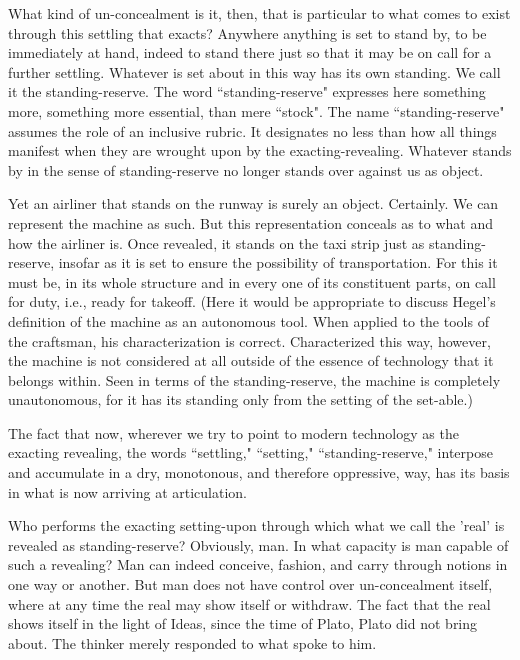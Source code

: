 What kind of un-concealment is it, then, that is particular to what comes to exist through this settling that exacts? Anywhere anything is set to stand by, to be immediately at hand, indeed to stand there just so that it may be on call for a further settling. Whatever is set about in this way has its own standing. We call it the standing-reserve. The word ``standing-reserve" expresses here something more, something more essential, than mere ``stock". The name ``standing-reserve" assumes the role of an inclusive rubric. It designates no less than how all things manifest when they are wrought upon by the exacting-revealing. Whatever stands by in the sense of standing-reserve no longer stands over against us as object.

Yet an airliner that stands on the runway is surely an object. Certainly. We can represent the machine as such. But this representation conceals as to what and how the airliner is. Once revealed, it stands on the taxi strip just as standing-reserve, insofar as it is set to ensure the possibility of transportation. For this it must be, in its whole structure and in every one of its constituent parts, on call for duty, i.e., ready for takeoff. (Here it would be appropriate to discuss Hegel's definition of the machine as an autonomous tool. When applied to the tools of the craftsman, his characterization is correct. Characterized this way, however, the machine is not considered at all outside of the essence of technology that it belongs within. Seen in terms of the standing-reserve, the machine is completely unautonomous, for it has its standing only from the setting of the set-able.)

The fact that now, wherever we try to point to modern technology as the exacting revealing, the words ``settling," ``setting," ``standing-reserve," interpose and accumulate in a dry, monotonous, and therefore oppressive, way, has its basis in what is now arriving at articulation.

Who performs the exacting setting-upon through which what we call the 'real' is revealed as standing-reserve? Obviously, man. In what capacity is man capable of such a revealing? Man can indeed conceive, fashion, and carry through notions in one way or another. But man does not have control over un-concealment itself, where at any time the real may show itself or withdraw. The fact that the real shows itself in the light of Ideas, since the time of Plato, Plato did not bring about. The thinker merely responded to what spoke to him.

